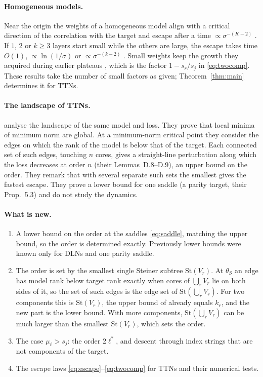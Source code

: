 \documentclass[11pt]{article}
\theoremstyle{definition}
\newcommand{\St}{\mathrm{St}}
\begin{document}
\paragraph{Homogeneous models.} Near the origin the weights of a homogeneous model align with a critical direction of
the correlation with the target and escape after a time $\propto\sigma^{-(K-2)}$ \citep{kumar2025early}. If $1$, $2$ or
$k\ge3$ layers start small while the others are large, the escape takes time $O(1)$, $\propto\ln(1/\sigma)$ or
$\propto\sigma^{-(k-2)}$ \citep[Thm~4.2]{rawal2026theory}. Small weights keep the growth they acquired during earlier
plateaus \citep{kunin2025alternating,zhang2026saddletosaddle}, which is the factor $1-s_r/s_j$ in \eqref{eq:twocomp}.
These results take the number of small factors as given; Theorem~\ref{thm:main} determines it for TTNs.

\paragraph{The landscape of TTNs.} \citet{furman2026benign} analyse the landscape of the same model and loss. They
prove that local minima of minimum norm are global. At a minimum-norm critical point they consider the edges on which
the rank of the model is below that of the target. Each connected set of such edges, touching $n$ cores, gives a
straight-line perturbation along which the loss decreases at order $n$ (their Lemmas~D.8--D.9), an upper bound on the
order. They remark that with several separate such sets the smallest gives the fastest escape. They prove a lower bound
for one saddle (a parity target, their Prop.~5.3) and do not study the dynamics.

\paragraph{What is new.}
\begin{enumerate}[label=(\arabic*)]
\item A lower bound on the order at the saddles \eqref{eq:saddle}, matching the upper bound, so the order is determined
exactly. Previously lower bounds were known only for DLNs and one parity saddle.
\item The order is set by the smallest single Steiner subtree $\St(V_r)$. At $\theta_S$ an edge has model rank below target
rank exactly when cores of $\bigcup_rV_r$ lie on both sides of it, so the set of such edges is the edge set of
$\St(\bigcup_rV_r)$. For two components this is $\St(V_r)$, the upper bound of \citet{furman2026benign} already equals
$k_r$, and the new part is the lower bound. With more components, $\St(\bigcup_rV_r)$ can be much larger than the smallest
$\St(V_r)$, which sets the order.
\item The case $\mu_\ell>s_j$: the order $2\ell^*$, and descent through index strings that are not components of the target.
\item The escape laws \eqref{eq:escape}--\eqref{eq:twocomp} for TTNs and their numerical tests.
\end{enumerate}
\end{document}
